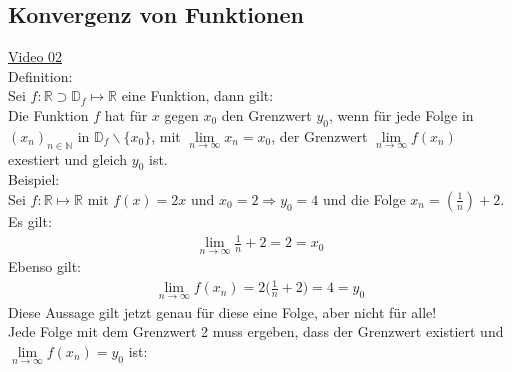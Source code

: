 \subsection{Konvergenz von Funktionen}
\href{https://youtu.be/JM5KwRHuPKc}{Video 02}\\
Definition:\\
Sei $ f:\mathbb{R}\supset \mathbb{D}_f\longmapsto \mathbb{R} $ eine Funktion, dann gilt:\\
Die Funktion $ f $ hat für $ x $ gegen $ x_0 $ den Grenzwert $ y_0 $, wenn für jede Folge in $ (x_n)_{n\in\mathbb{N}} $ in $ \mathbb{D}_f\backslash \{x_0\} $, mit $ \lim\limits_ {n\to\infty}x_n=x_0 $, der Grenzwert $ \lim\limits_ {n\to\infty} f(x_n) $ exestiert und gleich $ y_0 $ ist.\vspace*{2mm}\\
Beispiel:\\
Sei $ f: \mathbb{R}\longmapsto \mathbb{R} $ mit $ f(x)=2x $ und $ x_0=2\Rightarrow y_0=4 $ und die Folge $ x_n=(\frac{1}{n})+2 $.\\
Es gilt:
\begin{align*}
\lim\limits_ {n\to\infty} \frac{1}{n}+2=2=x_0
\end{align*}
Ebenso gilt:\\
\begin{align*}
\lim\limits_ {n\to\infty} f(x_n)=2\bigg(\frac{1}{n}+2\bigg)=4=y_0
\end{align*}
Diese Aussage gilt jetzt genau für diese eine Folge, aber nicht für alle!\\
Jede Folge mit dem Grenzwert 2 muss ergeben, dass der Grenzwert existiert und $ \lim\limits_ {n\to\infty} f(x_n)=y_0 $ ist:\\

